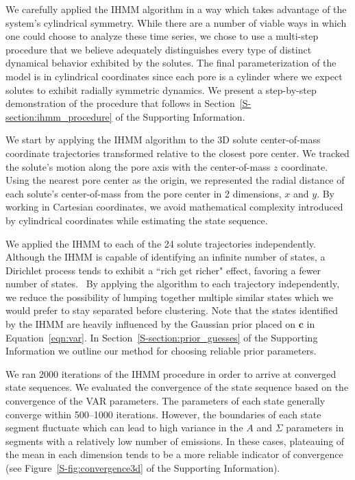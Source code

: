 \documentclass[journal=jpcbfk,manuscript=article]{achemso}
\begin{document}
  We carefully applied the IHMM algorithm in a way which takes advantage of the
  system's cylindrical symmetry. While there
  are a number of viable ways in which one could choose to analyze these time series,
  we chose to use a multi-step procedure that we believe adequately distinguishes 
  every type of distinct dynamical behavior exhibited by the solutes. The final
  parameterization of the model is in cylindrical coordinates since each pore is a
  cylinder where we expect solutes to exhibit radially symmetric dynamics. We 
  present a step-by-step demonstration of the procedure that follows in 
  Section~\ref{S-section:ihmm_procedure} of the Supporting Information.
  
  We start by applying the IHMM algorithm to the 3D solute center-of-mass coordinate 
  trajectories transformed relative to the closest pore center. We tracked the solute's
  motion along the pore axis with the center-of-mass $z$ coordinate. Using the nearest
  pore center as the origin, we represented the radial distance of each solute's 
  center-of-mass from the pore center in 2 dimensions, $x$ and $y$. By working in 
  Cartesian coordinates, we avoid mathematical complexity introduced by cylindrical 
  coordinates while estimating the state sequence.
  
  We applied the IHMM to each of the 24 solute trajectories independently.
  Although the IHMM is capable of identifying an infinite number of states, 
  a Dirichlet process tends to exhibit a ``rich get richer" effect, favoring
  a fewer number of states.~\cite{dreyer_discovering_2011} By applying the algorithm to each trajectory 
  independently, we reduce the possibility of lumping together multiple 
  similar states which we would prefer to stay separated before clustering.
  Note that the states identified by the IHMM are heavily influenced by 
  the Gaussian prior placed on $\mathbf{c}$ in Equation~\ref{eqn:var}. 
  In Section~\ref{S-section:prior_guesses} of the Supporting Information we 
  outline our method for choosing reliable prior parameters. 

  We ran 2000 iterations of the IHMM procedure in order to arrive at converged 
  state sequences. We evaluated the convergence of the state sequence based on
  the convergence of the VAR parameters. The parameters of each state
  generally converge within 500--1000 iterations. However, the boundaries of 
  each state segment fluctuate which can lead to high variance in the $A$
  and $\Sigma$ parameters in segments with a relatively low number of emissions.
  In these cases, plateauing of the mean in each dimension tends to be a more reliable indicator of
  convergence (see Figure~\ref{S-fig:convergence3d} of the Supporting Information).
  
\end{document}
